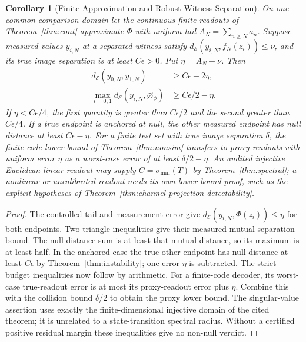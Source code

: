 \documentclass[11pt,a4paper]{article}
\theoremstyle{plain}
\newtheorem{corollary}[theorem]{Corollary}
\theoremstyle{definition}
\theoremstyle{remark}
\newcommand{\dE}{d_{\mathcal{E}}}
\newcommand{\nullphi}{\varnothing_\phi}
\begin{document}
\begin{corollary}[Finite Approximation and Robust Witness Separation]\label{cor:robust-approximation-null-separation}
On one common comparison domain let the continuous finite readouts of
Theorem~\ref{thm:cont} approximate $\Phi$ with uniform tail
$A_N=\sum_{n\geq N}a_n$. Suppose measured values $y_{i,N}$ at a separated
witness satisfy $\dE(y_{i,N},f_N(z_i))\leq\nu$, and its true image separation
is at least $C\epsilon>0$. Put $\eta=A_N+\nu$. Then
\[
\begin{aligned}
 \dE(y_{0,N},y_{1,N})&\geq C\epsilon-2\eta,\\
 \max_{i=0,1}\dE(y_{i,N},\nullphi)&\geq C\epsilon/2-\eta.
\end{aligned}
\]
If $\eta<C\epsilon/4$, the first quantity is greater than $C\epsilon/2$
and the second greater than $C\epsilon/4$. If a true endpoint is anchored at
null, the other measured endpoint has null distance at least $C\epsilon-\eta$.
For a finite test set with true image separation $\delta$, the finite-code
lower bound of Theorem~\ref{thm:nonsim} transfers to proxy readouts with
uniform error $\eta$ as a worst-case error of at least $\delta/2-\eta$.
An audited injective Euclidean linear readout may supply
$C=\sigma_{\min}(T)$ by Theorem~\ref{thm:spectral}; a nonlinear or uncalibrated
readout needs its own lower-bound proof, such as the explicit hypotheses of
Theorem~\ref{thm:channel-projection-detectability}.
\end{corollary}

\begin{proof}
The controlled tail and measurement error give
$\dE(y_{i,N},\Phi(z_i))\leq\eta$ for both endpoints. Two triangle
inequalities give their measured mutual separation bound. The null-distance
sum is at least that mutual distance, so its maximum is at least half.
In the anchored case the true other endpoint has null distance at least
$C\epsilon$ by Theorem~\ref{thm:instability}; one error $\eta$ is subtracted.
The strict budget inequalities now follow by arithmetic.
For a finite-code decoder, its worst-case true-readout error is at most its
proxy-readout error plus $\eta$. Combine this with the collision bound
$\delta/2$ to obtain the proxy lower bound. The singular-value assertion
uses exactly the finite-dimensional injective domain of the cited theorem;
it is unrelated to a state-transition spectral radius. Without a certified
positive residual margin these inequalities give no non-null verdict.
\end{proof}
\end{document}

